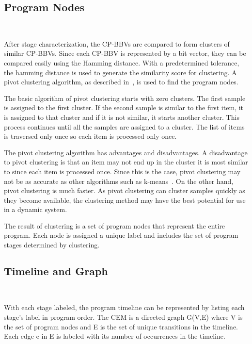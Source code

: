 \subsection{Program Nodes}~\label{sec:meth_nodes}

After stage characterization, the CP-BBVs are compared to form
clusters of similar CP-BBVs. Since
each CP-BBV is represented by a bit vector, they can be compared easily
using the Hamming distance. With a predetermined tolerance, the
hamming distance is used to generate the similarity score for
clustering. A pivot clustering algorithm, as described in~\cite{cogs-sim}, is
used to find the program nodes.

The basic algorithm of pivot clustering starts with zero
clusters. The first sample is assigned to the first cluster. If the
second sample is similar to the first item, it is assigned to that
cluster and if it is not similar, it starts another cluster. This process
continues until all the samples are assigned to a cluster. The list of
items is traversed only once so each item is processed only once.

The pivot clustering algorithm has advantages and disadvantages. A
disadvantage to pivot clustering is that an item may not end up in the
cluster it is most similar to since each item is processed once. Since
this is the case, pivot clustering may not be as accurate as other
algorithms such as k-means~\cite{k-means}. On the other hand, pivot
clustering is much faster. As pivot clustering can cluster
samples quickly as they become available, the clustering method may have the
best potential for use in a dynamic system.

The result of clustering is a set of program nodes
that represent the entire program. Each node is assigned a unique label and
includes the set of program stages determined by clustering.

\subsection{Timeline and Graph}~\label{sec:meth_timeline-graph}

With each stage labeled, the program timeline can be represented by listing each
stage's label in program order.
The CEM is a directed graph G(V,E) where V is the set of program
nodes and E is the set of unique transitions in the timeline. Each
edge e in E is labeled with its number of occurrences in the timeline.

